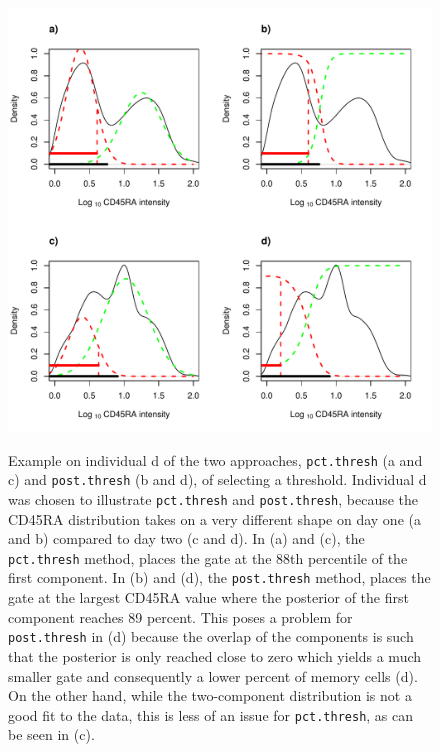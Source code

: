 \begin{figure}
\centering
\begin{minipage}{.6\textwidth}
  \includegraphics[width=\textwidth]{figures/cd45ra-threshold-example.pdf}
\end{minipage}
{ Example on individual d of the two approaches, \texttt{pct.thresh} (a and c) and \texttt{post.thresh} (b and d), of selecting a threshold. }
{
  Individual d was chosen to illustrate \texttt{pct.thresh} and \texttt{post.thresh}, because
  the CD45RA distribution takes on a very different shape on day one (a and b) compared to day two (c and d).
  In (a) and (c), the \texttt{pct.thresh} method, places the gate at the 88th percentile of the first component.
  In (b) and (d), the \texttt{post.thresh} method, places the gate at the largest CD45RA value where the posterior of the first component reaches 89 percent.
  This poses a problem for \texttt{post.thresh} in (d) because the overlap of the components is such that the posterior is only reached close to zero
  which yields a much smaller gate and consequently a lower percent of memory cells (d).
  On the other hand, while the two-component distribution is not a good fit to the data, this is less of an issue for \texttt{pct.thresh}, as can be seen in (c).
}
\end{figure}

